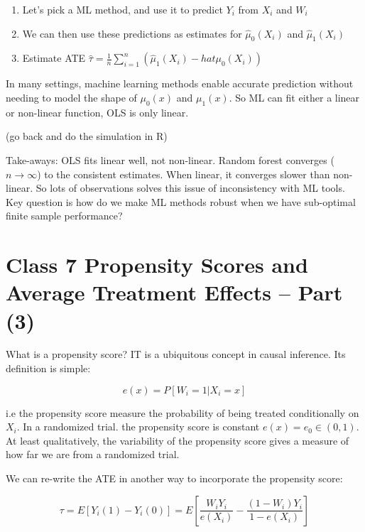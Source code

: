 \documentclass{article}
\begin{document}
\begin{enumerate}
    \item Let's pick a ML method, and use it to predict $Y_i$ from $X_i$ and $W_i$
    \item We can then use these predictions as estimates for $\hat{\mu}_{0} (X_i)$ and $\hat{\mu}_{1} (X_i)$
    \item Estimate ATE $\hat{\tau} = \frac{1}{n} \sum_{i=1}^n (\hat{\mu}_{1} (X_i) - hat{\mu}_{0} (X_i)) $ 
\end{enumerate}
 
In many settings, machine learning methods enable accurate prediction without needing to model the shape of $\mu_{0}(x)$ and $\mu_{1}(x)$. So ML can fit either a linear or non-linear function, OLS is only linear.

(go back and do the simulation in R)

Take-aways: OLS fits linear well, not non-linear. Random forest converges ($n \rightarrow \infty$) to the consistent estimates. When linear, it converges slower than non-linear. So lots of observations solves this issue of inconsistency with ML tools. Key question is how do we make ML methods robust when we have sub-optimal finite sample performance?


\section{Class 7 Propensity Scores and Average Treatment Effects -- Part (3)}

What is a propensity score? IT is a ubiquitous concept in causal inference. Its definition is simple:

\begin{equation}
    e(x) = P [W_i = 1 | X_i = x] 
\end{equation}

i.e the propensity score measure the probability of being treated conditionally on $X_i$. In a randomized trial. the propensity score is constant $e(x) = e_0 \in (0,1)$. At least qualitatively, the variability of the propensity score gives a measure of how far we are from a randomized trial.

We can re-write the ATE in another way to incorporate the propensity score:

\begin{equation}
    \tau = E [Y_i (1) - Y_i (0)] = E [\frac{W_i Y_i}{e(X_i)} - \frac{(1-W_i) Y_i}{1 - e(X_i)}] 
\end{equation}
\end{document}
